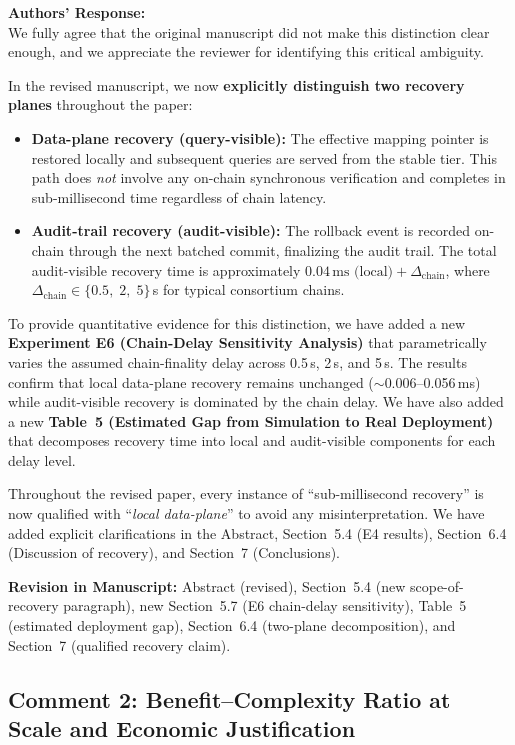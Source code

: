 \documentclass[11pt,a4paper]{article}
\newcommand{\response}[1]{%
  \noindent\textbf{\textcolor{responsecolor}{Authors' Response:}}\\
  #1\vspace{8pt}}
\newcommand{\revision}[1]{%
  \noindent\textbf{Revision in Manuscript:} #1\vspace{4pt}}
\begin{document}
\response{We fully agree that the original manuscript did not make this distinction clear enough, and we appreciate the reviewer for identifying this critical ambiguity.

In the revised manuscript, we now \textbf{explicitly distinguish two recovery planes} throughout the paper:

\begin{itemize}[nosep]
\item \textbf{Data-plane recovery (query-visible):} The effective mapping pointer is restored locally and subsequent queries are served from the stable tier. This path does \emph{not} involve any on-chain synchronous verification and completes in sub-millisecond time regardless of chain latency.
\item \textbf{Audit-trail recovery (audit-visible):} The rollback event is recorded on-chain through the next batched commit, finalizing the audit trail. The total audit-visible recovery time is approximately $0.04\,\text{ms (local)} + \Delta_{\text{chain}}$, where $\Delta_{\text{chain}} \in \{0.5,\;2,\;5\}\,$s for typical consortium chains.
\end{itemize}

To provide quantitative evidence for this distinction, we have added a new \textbf{Experiment E6 (Chain-Delay Sensitivity Analysis)} that parametrically varies the assumed chain-finality delay across 0.5\,s, 2\,s, and 5\,s. The results confirm that local data-plane recovery remains unchanged ($\sim$0.006--0.056\,ms) while audit-visible recovery is dominated by the chain delay. We have also added a new \textbf{Table~5 (Estimated Gap from Simulation to Real Deployment)} that decomposes recovery time into local and audit-visible components for each delay level.

Throughout the revised paper, every instance of ``sub-millisecond recovery'' is now qualified with ``\emph{local data-plane}'' to avoid any misinterpretation. We have added explicit clarifications in the Abstract, Section~5.4 (E4 results), Section~6.4 (Discussion of recovery), and Section~7 (Conclusions).}

\revision{Abstract (revised), Section~5.4 (new scope-of-recovery paragraph), new Section~5.7 (E6 chain-delay sensitivity), Table~5 (estimated deployment gap), Section~6.4 (two-plane decomposition), and Section~7 (qualified recovery claim).}

\subsection*{Comment 2: Benefit--Complexity Ratio at Scale and Economic Justification}
\end{document}
